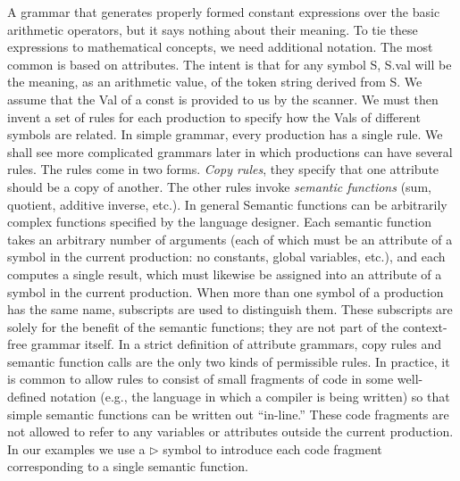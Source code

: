 \documentclass[a4paper,12pt]{article}
\begin{document}
A grammar that generates properly formed constant expressions over the basic arithmetic operators, but it says nothing about their meaning. To tie these expressions to mathematical concepts, we need additional notation. The most common is based on attributes. The intent is that for any symbol S, S.val will be the meaning, as an arithmetic value, of the token string derived from S. We assume that the Val of a const is provided to us by the scanner. We must then invent a set of rules for each production to specify how the Vals of different symbols are related. In simple grammar, every production has a single rule. We shall see more complicated grammars later in which productions can have several rules. The rules come in two forms. \textit{Copy rules}, they specify that one attribute should be a copy of another. The other rules invoke \textit{semantic functions} (sum, quotient, additive inverse, etc.). In general Semantic functions can be arbitrarily complex functions specified by the language designer. Each semantic function takes an arbitrary number of arguments (each of which must be an attribute of a symbol in the current production: no constants, global variables,
etc.), and each computes a single result, which must likewise be assigned into an attribute of a symbol in the current production. When more than one symbol of a production has the same name, subscripts are used to distinguish them. These subscripts are solely for the benefit of the semantic functions; they are not part of the context-free grammar itself.
In a strict definition of attribute grammars, copy rules and semantic function calls are the only two kinds of permissible rules. In practice, it is common to allow rules to consist of small fragments of code in some well-defined notation (e.g., the language in which a compiler is being written) so that simple semantic functions can be written out ``in-line.'' These code fragments are not allowed to refer to any variables or attributes outside the current production. In our examples we use a $\triangleright$    symbol to introduce each code fragment corresponding to a single semantic function.
\end{document}
